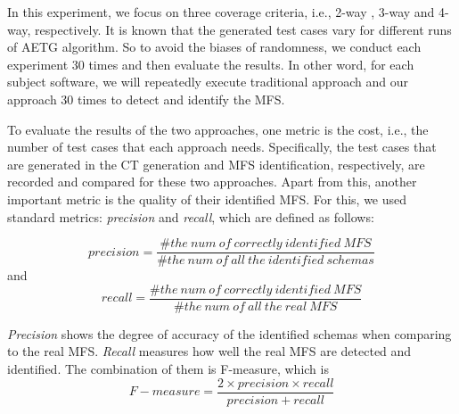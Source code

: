 \documentclass{sig-alternate}
\begin{document}
In this experiment, we focus on three coverage criteria, i.e., 2-way , 3-way and 4-way, respectively. It is known that the generated test cases vary for different runs of AETG algorithm. So to avoid the biases of randomness, we conduct each experiment 30 times and then evaluate the results.  In other word, for each subject software, we will repeatedly execute traditional approach and our approach 30 times to detect and identify the MFS.

To evaluate the results of the two approaches, one metric is the cost, i.e., the number of test cases that each approach needs. Specifically, the test cases that are generated in the CT generation and MFS identification, respectively, are recorded and compared for these two approaches.  Apart from this, another important metric is the quality of their identified MFS. For this, we used standard metrics: \emph{precision} and \emph{recall}, which are defined as follows:

$$precision =  \frac{\#the\ num\ of\ correctly\ identified\  MFS}{\#the\ num\ of\ all\ the\ identified\ schemas}$$
and
$$recall  =  \frac{\#the\ num\ of\ correctly\ identified\  MFS}{\#the\ num\ of\ all\ the\ real\ MFS} $$

\emph{Precision} shows the degree of accuracy of the identified schemas when comparing to the real MFS. \emph{Recall} measures how well the real MFS are detected and identified. The combination of them is F-measure, which is
$$F-measure = \frac{2 \times precision \times recall}{precision + recall}$$
%
%
%
%
\end{document}
